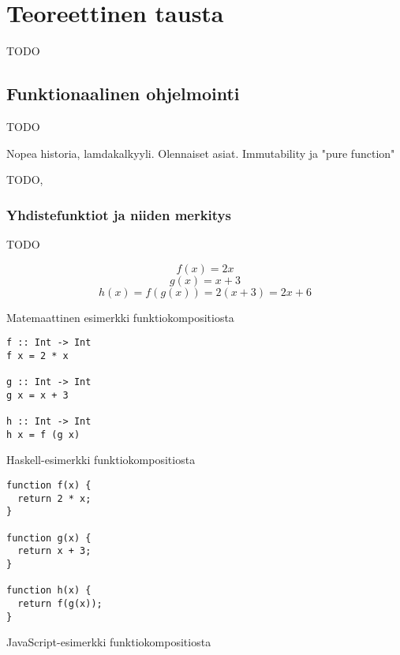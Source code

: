 \vspace{21.5pt}
\chapter{Teoreettinen tausta}

TODO

\section{Funktionaalinen ohjelmointi}

TODO

Nopea historia, lamdakalkyyli. Olennaiset asiat. Immutability ja "pure function"

TODO,

\subsection{Yhdistefunktiot ja niiden merkitys}


TODO

\begin{code}
  \begin{equation}
    f(x) = 2x
  \end{equation}
  \begin{equation}
    g(x) = x + 3
  \end{equation}
  \begin{equation}
    h(x) = f(g(x)) = 2(x + 3) = 2x + 6
  \end{equation}
  \caption{Matemaattinen esimerkki funktiokompositiosta}
  \label{equation:composition}
\end{code}
\bigskip

\begin{code}
  \begin{verbatim}
f :: Int -> Int
f x = 2 * x

g :: Int -> Int
g x = x + 3

h :: Int -> Int
h x = f (g x)
\end{verbatim}
  \caption{Haskell-esimerkki funktiokompositiosta}
  \label{code:haskell_composition}
\end{code}
\bigskip
\begin{code}
  \begin{verbatim}
function f(x) {
  return 2 * x;
}

function g(x) {
  return x + 3;
}

function h(x) {
  return f(g(x));
}
\end{verbatim}
  \caption{JavaScript-esimerkki funktiokompositiosta}
  \label{code:javascript_composition}
\end{code}


